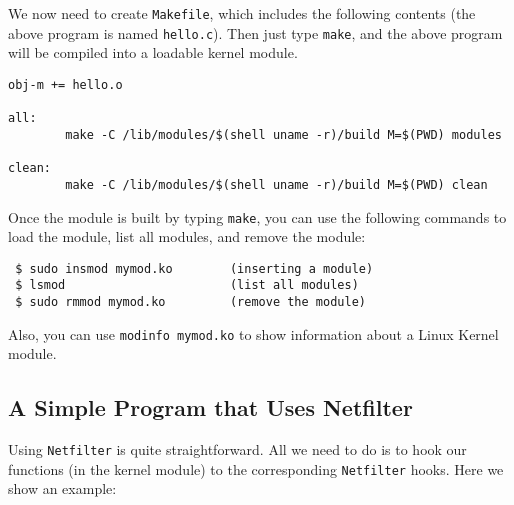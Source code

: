 We now need to create {\tt Makefile}, which includes the following
contents (the above program is named {\tt hello.c}). Then 
just type {\tt make}, and the above program will be compiled
into a loadable kernel module.



\begin{lstlisting}
obj-m += hello.o

all:
        make -C /lib/modules/$(shell uname -r)/build M=$(PWD) modules

clean:
        make -C /lib/modules/$(shell uname -r)/build M=$(PWD) clean
\end{lstlisting}


Once the module is built by typing {\tt make}, you can use the following commands to 
load the module, list all modules, and remove the module:

\begin{lstlisting}
 $ sudo insmod mymod.ko        (inserting a module)
 $ lsmod                       (list all modules)
 $ sudo rmmod mymod.ko         (remove the module)
\end{lstlisting}

Also, you can use {\tt modinfo mymod.ko} to show information about a 
Linux Kernel module.




\subsection{A Simple Program that Uses Netfilter}

Using {\tt Netfilter} is quite straightforward. All we need to do
is to hook our functions (in the kernel module) to the corresponding
{\tt Netfilter} hooks. Here we show an example:


